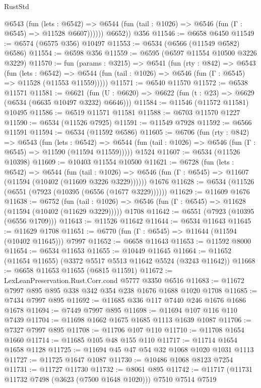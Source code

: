 \begin{lexlean}{RustStd}
\begin{coremodule}
            @6543
              (fun (lets : @6542) =>
              @6544 (fun (tail : @1026) => @6546 (fun (Γ : @6545) => @11528 @6607))))))
        @6652))
    @356
@11546 := @6658 @6450
@11549 := @6574 (@6575 @356) @10497
@11553 := @6534 (@6566 (@11549 @6582) @6586)
@11554 := @6598 @356
@11559 := @6595 (@6597 @11554 @10500 @3226 @3229)
@11570 := fun (params : @3215) =>
  @6541
    (fun (rty : @842) =>
    @6543
      (fun (lets : @6542) =>
      @6544 (fun (tail : @1026) => @6546 (fun (Γ : @6545) => @11528 (@11553 @11559)))))
@11571 := @6540 @11570
@11572 := @6538 @11571
@11581 := @6621
    (fun (U : @6620) => @6622 (fun (t : @23) => @6629 (@6534 (@6635 @10497 @3232) @6646)))
@11584 := @11546 (@11572 @11581) @10495
@11586 := @6519 @11571 @11581
@11588 := @6703 @11570 @1227
@11590 := @6534 (@11526 @7925)
@11591 := @11549 @7928
@11592 := @6566 @11591
@11594 := @6534 (@11592 @6586)
@11605 := @6706
    (fun (rty : @842) =>
    @6543
      (fun (lets : @6542) =>
      @6544 (fun (tail : @1026) => @6546 (fun (Γ : @6545) => @11590 (@11594 @11559)))))
    @1524
@11607 := @6534 (@11526 @10398)
@11609 := @10403 @11554 @10500
@11621 := @6728
    (fun (lets : @6542) =>
    @6544
      (fun (tail : @1026) =>
      @6546 (fun (Γ : @6545) => @11607 (@11594 (@10402 (@11609 @3226 @3229))))))
    @1676
@11628 := @6534 (@11526 (@6551 (@7923 (@10395 (@6556 (@1677 @3229))))))
@11629 := @11609 @1676
@11638 := @6752
    (fun (tail : @1026) => @6546 (fun (Γ : @6545) => @11628 (@11594 (@10402 (@11629 @3229)))))
    @1708
@11642 := @6551 (@7923 (@10395 (@6556 @1709)))
@11643 := @11526 @11642
@11644 := @6534 @11643
@11645 := @11629 @1708
@11651 := @6770 (fun (Γ : @6545) => @11644 (@11594 (@10402 @11645))) @7997
@11652 := @6658 @11643
@11653 := @11592 @8000
@11654 := @6534 @11653
@11655 := @10449 @11645
@11664 := @11652 (@11654 @11655) (@3372 @5517 @5513 @11642 @5524 (@3243 @11642))
@11668 := @6658 @11653 @11655 (@6815 @11591)
@11672 := LexLeanPreservation.Rust.Corr.cond @5777 @3350 @6516
@11683 := @11672 @7997 @895 @895 @338 @342 @354 @238 @1676 @1688 @1020 @1708
@11685 := @7434 @7997 @895
@11692 := @11685 @336 @117 @7440 @246 @1676 @1686 @1678
@11694 := @7449 @7997 @895
@11698 := @11694 @107 @116 @110 @7439
@11704 := @11698 @1662 @1675 @1685 @1113 @1639 @1087
@11706 := @7327 @7997 @895
@11708 := @11706 @107 @110
@11710 := @11708 @1654 @1660
@11714 := @11685 @105 @48 @155 @110
@11717 := @11714 @1654 @1658 @1128
@11725 := @11694 @45 @47 @54 @32 @1068 @1020 @1031 @1113
@11727 := @11725 @1647 @1087
@11730 := @10486 @1068 @8123 @7254
@11731 := @11727 @11730
@11732 := @8061 @895
@11742 := @11717 (@11731 @11732 @7498 (@3623 (@7500 @1648 @1020))) @7510 @7514 @7519

\end{coremodule}
\end{lexlean}
